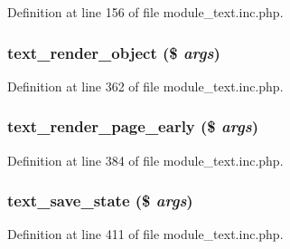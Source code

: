 Definition at line 156 of file module\_\-text.inc.php.

\hypertarget{module__text_8inc_8php_a8e9b1db22ff6cb0f3d20815da6aae6ce}{
\subsubsection[{text\_\-render\_\-object}]{\setlength{\rightskip}{0pt plus 5cm}text\_\-render\_\-object (\$ {\em args})}}
\label{module__text_8inc_8php_a8e9b1db22ff6cb0f3d20815da6aae6ce}


Definition at line 362 of file module\_\-text.inc.php.

\hypertarget{module__text_8inc_8php_aaaa8b8407d795f6dba9d258f1457ade8}{
\subsubsection[{text\_\-render\_\-page\_\-early}]{\setlength{\rightskip}{0pt plus 5cm}text\_\-render\_\-page\_\-early (\$ {\em args})}}
\label{module__text_8inc_8php_aaaa8b8407d795f6dba9d258f1457ade8}


Definition at line 384 of file module\_\-text.inc.php.

\hypertarget{module__text_8inc_8php_a7fa0ea2ee517914595d7eda355177289}{
\subsubsection[{text\_\-save\_\-state}]{\setlength{\rightskip}{0pt plus 5cm}text\_\-save\_\-state (\$ {\em args})}}
\label{module__text_8inc_8php_a7fa0ea2ee517914595d7eda355177289}


Definition at line 411 of file module\_\-text.inc.php.

